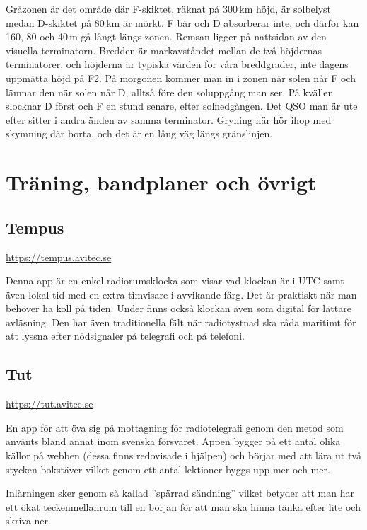 Gråzonen är det område där F-skiktet, räknat på 300\,km höjd, är solbelyst
medan D-skiktet på 80\,km är mörkt. F bär och D absorberar inte, och därför
kan 160, 80 och 40\,m gå långt längs zonen. Remsan ligger på nattsidan av
den visuella terminatorn. Bredden är markavståndet mellan de två höjdernas
terminatorer, och höjderna är typiska värden för våra breddgrader, inte
dagens uppmätta höjd på F2. På morgonen kommer man in i zonen när solen når
F och lämnar den när solen når D, alltså före den soluppgång man ser. På
kvällen slocknar D först och F en stund senare, efter solnedgången. Det
QSO man är ute efter sitter i andra änden av samma terminator. Gryning här
hör ihop med skymning där borta, och det är en lång väg längs
gränslinjen.


\section{Träning, bandplaner och övrigt}

\subsection{Tempus}

\url{https://tempus.avitec.se}

Denna app är en enkel radiorumsklocka som visar vad klockan är i UTC
samt även lokal tid med en extra timvisare i avvikande färg. Det är
praktiskt när man behöver ha koll på tiden. Under finns också klockan
även som digital för lättare avläsning. Den har även traditionella
fält när radiotystnad ska råda maritimt för att lyssna efter
nödsignaler på telegrafi och på telefoni.


\subsection{Tut}

\url{https://tut.avitec.se}

En app för att öva sig på mottagning för radiotelegrafi genom den
metod som använts bland annat inom svenska försvaret. Appen bygger på
ett antal olika källor på webben (dessa finns redovisade i hjälpen)
och börjar med att lära ut två stycken bokstäver vilket genom ett
antal lektioner byggs upp mer och mer.

Inlärningen sker genom så kallad ''spärrad sändning'' vilket betyder
att man har ett ökat teckenmellanrum till en början för att man ska
hinna tänka efter lite och skriva ner.

